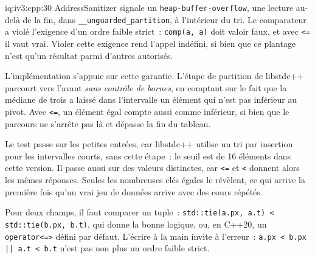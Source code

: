 \begin{solution}{iq:iv3:cpp:30}
AddressSanitizer signale un \texttt{heap-buffer-overflow}, une lecture au-delà de la fin, dans \texttt{\_\_unguarded\_partition}, à l'intérieur du tri. Le comparateur a violé l'exigence d'un ordre faible strict~: \texttt{comp(a, a)} doit valoir faux, et avec \texttt{<=} il vaut vrai. Violer cette exigence rend l'appel indéfini, si bien que ce plantage n'est qu'un résultat parmi d'autres autorisés.

L'implémentation s'appuie sur cette garantie. L'étape de partition de libstdc++ parcourt vers l'avant \emph{sans contrôle de bornes}, en comptant sur le fait que la médiane de trois a laissé dans l'intervalle un élément qui n'est pas inférieur au pivot. Avec \texttt{<=}, un élément égal compte aussi comme inférieur, si bien que le parcours ne s'arrête pas là et dépasse la fin du tableau.

Le test passe sur les petites entrées, car libstdc++ utilise un tri par insertion pour les intervalles courts, sans cette étape~: le seuil est de 16 éléments dans cette version. Il passe aussi sur des valeurs distinctes, car \texttt{<=} et \texttt{<} donnent alors les mêmes réponses. Seules les nombreuses clés égales le révèlent, ce qui arrive la première fois qu'un vrai jeu de données arrive avec des cours répétés.

Pour deux champs, il faut comparer un tuple~: \texttt{std::tie(a.px, a.t) < std::tie(b.px, b.t)}, qui donne la bonne logique, ou, en C++20, un \texttt{operator<=>} défini par défaut. L'écrire à la main invite à l'erreur~: \texttt{a.px < b.px || a.t < b.t} n'est pas non plus un ordre faible strict.

\end{solution}

